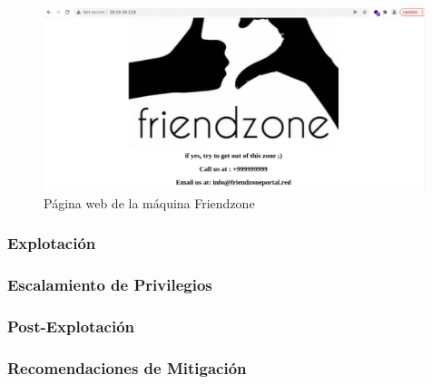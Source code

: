         \begin{figure}[H]
            \centering
            \includegraphics[width=0.99\textwidth]{informe4/imagenes/friendzone/06_web.png}
            \caption{Página web de la máquina Friendzone} 
        \end{figure}


    \subsubsection{Explotación}

    \subsubsection{Escalamiento de Privilegios}

    \subsubsection{Post-Explotación}

    \subsubsection{Recomendaciones de Mitigación}
